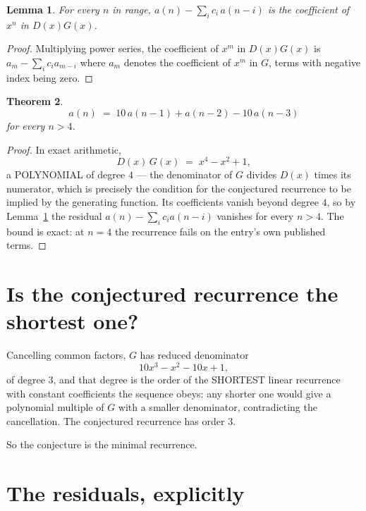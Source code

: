 \documentclass[11pt,a4paper]{article}
\theoremstyle{plain}
\newtheorem{theorem}{Theorem}
\newtheorem{lemma}[theorem]{Lemma}
\theoremstyle{definition}
\begin{document}
\begin{lemma}\label{lem:key}
For every $n$ in range, $a(n)-\sum_i c_i\,a(n-i)$ is the coefficient of $x^{n}$ in
$D(x)G(x)$.
\end{lemma}

\begin{proof}
Multiplying power series, the coefficient of $x^{m}$ in $D(x)G(x)$ is
$a_m-\sum_i c_i a_{m-i}$ where $a_m$ denotes the coefficient of $x^{m}$ in $G$, terms with
negative index being zero.
\end{proof}

\begin{theorem}
\[
a(n)\;=\;10\,a(n-1) + a(n-2) - 10\,a(n-3)
\]
for every $n>4$.
\end{theorem}

\begin{proof}
In exact arithmetic,
\[
D(x)\,G(x)\;=\;x^{4} - x^{2} + 1,
\]
a POLYNOMIAL of degree $4$ --- the denominator of $G$ divides $D(x)$ times its numerator,
which is precisely the condition for the conjectured recurrence to be implied by the
generating function. Its coefficients vanish beyond degree $4$, so by
Lemma~\ref{lem:key} the residual $a(n)-\sum_ic_ia(n-i)$ vanishes for every
$n>4$. The bound is exact: at $n=4$ the recurrence fails on the entry's own published terms.
\end{proof}

\section{Is the conjectured recurrence the shortest one?}

Cancelling common factors, $G$ has reduced denominator
\[
10 x^{3} - x^{2} - 10 x + 1,
\]
of degree $3$, and that degree is the order of the SHORTEST linear recurrence with
constant coefficients the sequence obeys: any shorter one would give a polynomial multiple of
$G$ with a smaller denominator, contradicting the cancellation. The conjectured recurrence has
order $3$.

So the conjecture is the minimal recurrence.

\section{The residuals, explicitly}
\end{document}
